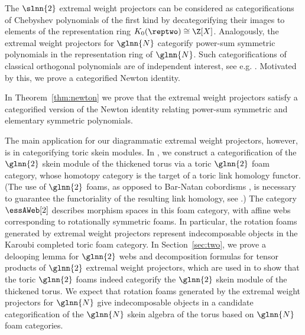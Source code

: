 The $\slnn{2}$ extremal weight projectors can be considered as categorifications
of Chebyshev polynomials of the first kind by decategorifying their images to
elements of the representation ring $K_0(\reptwo)\cong \Z[X]$. Analogously, the
extremal weight projectors for $\glnn{N}$ categorify power-sum symmetric
polynomials in the representation ring of $\glnn{N}$. Such categorifications of
classical orthogonal polynomials are of independent interest, see e.g.
\cite{KSa}. Motivated by this, we prove a categorified Newton identity.

\begin{result} In Theorem~\ref{thm:newton} we prove that the extremal weight
projectors satisfy a categorified version of the Newton identity relating
power-sum symmetric and elementary symmetric polynomials.
\end{result} 

The main application for our diagrammatic extremal weight projectors, however,
is in categorifying toric skein modules. In \cite{QW3}, we construct a
categorification of the $\glnn{2}$ skein module of the thickened torus via a
toric $\glnn{2}$ foam category, whose homotopy category is the target of a toric
link homology functor. (The use of $\glnn{2}$ foams, as opposed to Bar-Natan
cobordisms \cite{BN2}, is necessary to guarantee the functoriality of the
resulting link homology, see \cite{Blan, ETW}.) The category $\essAWeb[2]$
describes morphism spaces in this foam category, with affine webs corresponding
to rotationally symmetric foams. In particular, the rotation foams generated by
extremal weight projectors represent indecomposable objects in the Karoubi
completed toric foam category. In Section~\ref{sec:two}, we prove a delooping
lemma for $\glnn{2}$ webs and decomposition formulas for tensor products of
$\glnn{2}$ extremal weight projectors, which are used in \cite{QW3} to show that
the toric $\glnn{2}$ foams indeed categorify the $\glnn{2}$ skein module of the
thickened torus. We expect that rotation foams generated by the extremal weight
projectors for $\glnn{N}$ give indecomposable objects in a candidate
categorification of the $\glnn{N}$ skein algebra of the torus based on
$\glnn{N}$ foam categories. 



